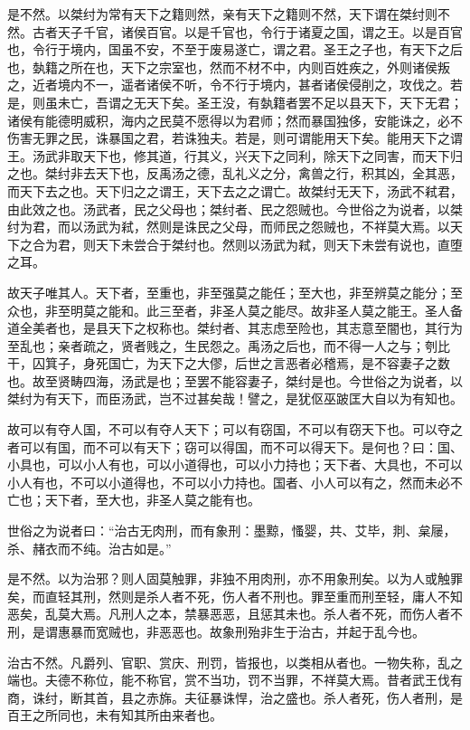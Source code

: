 \documentclass[]{article}
\begin{document}
是不然。以桀纣为常有天下之籍则然，亲有天下之籍则不然，天下谓在桀纣则不然。古者天子千官，诸侯百官。以是千官也，令行于诸夏之国，谓之王。以是百官也，令行于境内，国虽不安，不至于废易遂亡，谓之君。圣王之子也，有天下之后也，埶籍之所在也，天下之宗室也，然而不材不中，内则百姓疾之，外则诸侯叛之，近者境内不一，遥者诸侯不听，令不行于境内，甚者诸侯侵削之，攻伐之。若是，则虽未亡，吾谓之无天下矣。圣王没，有埶籍者罢不足以县天下，天下无君；诸侯有能德明威积，海内之民莫不愿得以为君师；然而暴国独侈，安能诛之，必不伤害无罪之民，诛暴国之君，若诛独夫。若是，则可谓能用天下矣。能用天下之谓王。汤武非取天下也，修其道，行其义，兴天下之同利，除天下之同害，而天下归之也。桀纣非去天下也，反禹汤之德，乱礼义之分，禽兽之行，积其凶，全其恶，而天下去之也。天下归之之谓王，天下去之之谓亡。故桀纣无天下，汤武不弒君，由此效之也。汤武者，民之父母也；桀纣者、民之怨贼也。今世俗之为说者，以桀纣为君，而以汤武为弒，然则是诛民之父母，而师民之怨贼也，不祥莫大焉。以天下之合为君，则天下未尝合于桀纣也。然则以汤武为弒，则天下未尝有说也，直堕之耳。

故天子唯其人。天下者，至重也，非至强莫之能任；至大也，非至辨莫之能分；至众也，非至明莫之能和。此三至者，非圣人莫之能尽。故非圣人莫之能王。圣人备道全美者也，是县天下之权称也。桀纣者、其志虑至险也，其志意至闇也，其行为至乱也；亲者疏之，贤者贱之，生民怨之。禹汤之后也，而不得一人之与；刳比干，囚箕子，身死国亡，为天下之大僇，后世之言恶者必稽焉，是不容妻子之数也。故至贤畴四海，汤武是也；至罢不能容妻子，桀纣是也。今世俗之为说者，以桀纣为有天下，而臣汤武，岂不过甚矣哉！譬之，是犹伛巫跛匡大自以为有知也。

故可以有夺人国，不可以有夺人天下；可以有窃国，不可以有窃天下也。可以夺之者可以有国，而不可以有天下；窃可以得国，而不可以得天下。是何也？曰：国、小具也，可以小人有也，可以小道得也，可以小力持也；天下者、大具也，不可以小人有也，不可以小道得也，不可以小力持也。国者、小人可以有之，然而未必不亡也；天下者，至大也，非圣人莫之能有也。

世俗之为说者曰：``治古无肉刑，而有象刑：墨黥，慅婴，共、艾毕，剕、枲屦，杀、赭衣而不纯。治古如是。''

是不然。以为治邪？则人固莫触罪，非独不用肉刑，亦不用象刑矣。以为人或触罪矣，而直轻其刑，然则是杀人者不死，伤人者不刑也。罪至重而刑至轻，庸人不知恶矣，乱莫大焉。凡刑人之本，禁暴恶恶，且惩其未也。杀人者不死，而伤人者不刑，是谓惠暴而宽贼也，非恶恶也。故象刑殆非生于治古，并起于乱今也。

治古不然。凡爵列、官职、赏庆、刑罚，皆报也，以类相从者也。一物失称，乱之端也。夫德不称位，能不称官，赏不当功，罚不当罪，不祥莫大焉。昔者武王伐有商，诛纣，断其首，县之赤旆。夫征暴诛悍，治之盛也。杀人者死，伤人者刑，是百王之所同也，未有知其所由来者也。
\end{document}

